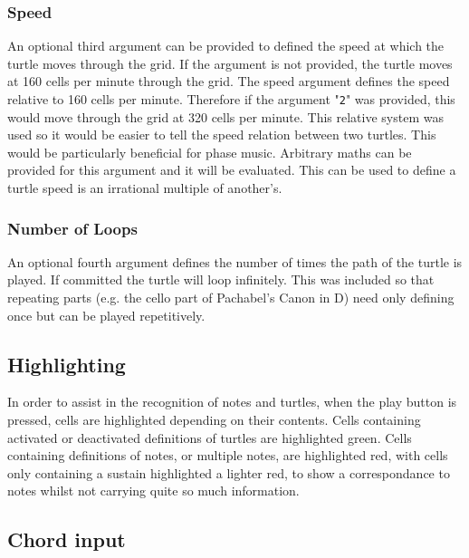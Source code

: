 \subsubsection{Speed}

An optional third argument can be provided to defined the speed at which the turtle moves through the grid. If the argument is not provided, the turtle moves at 160 cells per minute through the grid. The speed argument defines the speed relative to 160 cells per minute. Therefore if the argument "\texttt{2}" was provided, this would move through the grid at 320 cells per minute. This relative system was used so it would be easier to tell the speed relation between two turtles. This would be particularly beneficial for phase music. Arbitrary maths can be provided for this argument and it will be evaluated. This can be used to define a turtle  speed is an irrational multiple of another's.

\subsubsection{Number of Loops}

An optional fourth argument defines the number of times the path of the turtle is played. If committed the turtle will loop infinitely. This was included so that repeating parts (e.g. the cello part of Pachabel's Canon in D) need only defining once but can be played repetitively.

\subsection{Highlighting}

In order to assist in the recognition of notes and turtles, when the play button is pressed, cells are highlighted depending on their contents. Cells containing activated or deactivated definitions of turtles are highlighted green. Cells containing definitions of notes, or multiple notes, are highlighted red, with cells only containing a sustain highlighted a lighter red, to show a correspondance to notes whilst not carrying quite so much information.

\subsection{Chord input}

